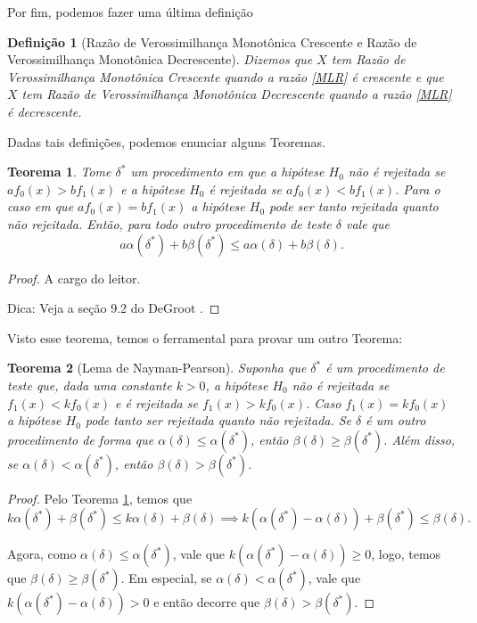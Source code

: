 \documentclass{article}
\newtheorem{definition}{Definição}
\newtheorem{theorem}{Teorema}
\begin{document}
Por fim, podemos fazer uma última definição
\begin{definition}[Razão de Verossimilhança Monotônica Crescente e Razão de Verossimilhança Monotônica Decrescente]
    Dizemos que $X$ tem Razão de Verossimilhança Monotônica Crescente quando a razão \ref{MLR} é crescente e que $X$ tem Razão de Verossimilhança Monotônica Decrescente quando a razão \ref{MLR} é decrescente.
\end{definition}

Dadas tais definições, podemos enunciar alguns Teoremas.
\begin{theorem} \label{teo1}
    Tome $\delta^*$ um procedimento em que a hipótese $H_0$ não é rejeitada se $a f_0(x) > b f_1(x)$ e a hipótese $H_0$ é rejeitada se $a f_0(x) < b f_1(x)$. Para o caso em que $a f_0(x) = b f_1(x)$ a hipótese $H_0$ pode ser tanto rejeitada quanto não rejeitada. Então, para todo outro procedimento de teste $\delta$ vale que
    \[a \alpha(\delta^*) + b \beta(\delta^*) \leq a \alpha(\delta) + b \beta(\delta).\]
\end{theorem}

\begin{proof}
    A cargo do leitor.
    \vspace{12pt}
    
    \noindent Dica: Veja a seção 9.2 do DeGroot \cite{degroot}.
\end{proof}

Visto esse teorema, temos o ferramental para provar um outro Teorema:

\begin{theorem}[Lema de Nayman-Pearson]\label{teo2}
    Suponha que $\delta^*$ é um procedimento de teste que, dada uma constante $k > 0$, a hipótese $H_0$ não é rejeitada se $f_1(x) < k f_0(x)$ e é rejeitada se $f_1(x) > k f_0(x)$. Caso $f_1(x) = k f_0(x)$ a hipótese $H_0$ pode tanto ser rejeitada quanto não rejeitada. Se $\delta$ é um outro procedimento de forma que $\alpha(\delta) \leq \alpha(\delta^*)$, então $\beta(\delta) \geq \beta(\delta^*)$. Além disso, se $\alpha(\delta) < \alpha(\delta^*)$, então $\beta(\delta) > \beta(\delta^*)$.
\end{theorem}

\begin{proof}
    Pelo Teorema \ref{teo1}, temos que
    \[k \alpha(\delta^*) + \beta(\delta^*) \leq k \alpha(\delta) + \beta(\delta) \implies k \left(\alpha(\delta^*) - \alpha(\delta)\right) + \beta(\delta^*) \leq \beta(\delta).\]
    
    \noindent Agora, como $\alpha(\delta) \leq \alpha(\delta^*)$, vale que $k \left(\alpha(\delta^*) - \alpha(\delta)\right) \geq 0$, logo, temos que $\beta(\delta) \geq \beta(\delta^*)$. Em especial, se $\alpha(\delta) < \alpha(\delta^*)$, vale que $k \left(\alpha(\delta^*) - \alpha(\delta)\right) > 0$ e então decorre que $\beta(\delta) > \beta(\delta^*)$.
\end{proof}
\end{document}
